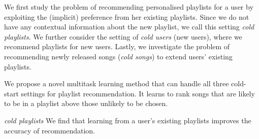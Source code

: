 
We first study the problem of recommending %
personalised playlists for a user
by exploiting the (implicit) preference %
from her existing playlists.
Since we do not have any contextual information about the new playlist, 
we call this setting \emph{cold playlists}.
%
We further consider the setting of \emph{cold users} (\ie new users),
where we recommend playlists for new users. %
%
%
%
Lastly, we investigate the problem of recommending newly released songs (\ie \emph{cold songs}) to extend users' existing playlists. 


We propose a novel multitask learning method that %
can handle
all three cold-start settings for playlist recommendation.
It learns to rank songs that are likely to be in a playlist %
above those unlikely to be chosen. %



\emph{cold playlists}
We find that learning from a user's existing playlists %
improves the accuracy of recommendation.


